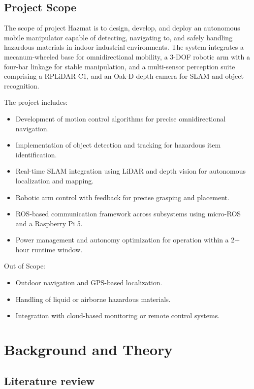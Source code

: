 \documentclass{article}
\begin{document}
\normalsize

\subsection{Project Scope}

The scope of project Hazmat is to design, develop, and deploy an autonomous mobile manipulator capable of detecting, navigating to, and safely handling hazardous materials in indoor industrial environments. The system integrates a mecanum-wheeled base for omnidirectional mobility, a 3-DOF robotic arm with a four-bar linkage for stable manipulation, and a multi-sensor perception suite comprising a RPLiDAR C1, and an Oak-D depth camera for SLAM and object recognition.

The project includes:

\begin{itemize}
    \item Development of motion control algorithms for precise omnidirectional navigation.
    \item Implementation of object detection and tracking for hazardous item identification.
    \item Real-time SLAM integration using LiDAR and depth vision for autonomous localization and mapping.
    \item Robotic arm control with feedback for precise grasping and placement.
    \item ROS-based communication framework across subsystems using micro-ROS and a Raspberry Pi 5.
    \item Power management and autonomy optimization for operation within a 2+ hour runtime window.
\end{itemize}

Out of Scope:

\begin{itemize}
    \item Outdoor navigation and GPS-based localization.
    \item Handling of liquid or airborne hazardous materials.
    \item Integration with cloud-based monitoring or remote control systems.
\end{itemize}

\section{Background and Theory}

\subsection{Literature review}
\end{document}

